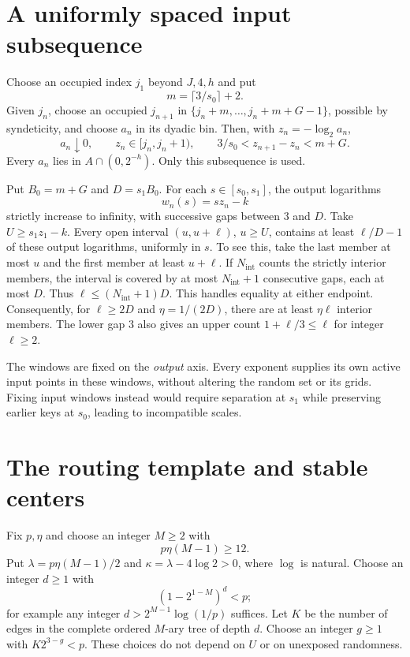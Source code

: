 \documentclass[11pt,letterpaper]{article}
\newcommand{\logtwo}{\log_2}
\begin{document}
\section{A uniformly spaced input subsequence}
Choose an occupied index $j_1$ beyond $J,4,h$ and put
\[
 m=\lceil3/s_0\rceil+2.
\]
Given $j_n$, choose an occupied $j_{n+1}$ in
$\{j_n+m,\ldots,j_n+m+G-1\}$, possible by syndeticity, and choose $a_n$ in
its dyadic bin. Then, with $z_n=-\logtwo a_n$,
\[
 a_n\downarrow0,\qquad z_n\in[j_n,j_n+1),\qquad
 3/s_0<z_{n+1}-z_n<m+G.
\]
Every $a_n$ lies in $A\cap(0,2^{-h})$. Only this subsequence is used.

Put $B_0=m+G$ and $D=s_1B_0$. For each $s\in[s_0,s_1]$, the output logarithms
\[
 w_n(s)=sz_n-k
\]
strictly increase to infinity, with successive gaps between $3$ and $D$.
Take $U\ge s_1z_1-k$. Every open interval $(u,u+\ell)$, $u\ge U$, contains
at least $\ell/D-1$ of these output logarithms, uniformly in $s$.
To see this, take the last member at most $u$ and the first member at least
$u+\ell$. If $N_\mathrm{int}$ counts the strictly interior members, the interval
is covered by at most $N_\mathrm{int}+1$ consecutive gaps, each at most $D$.
Thus $\ell\le(N_\mathrm{int}+1)D$. This handles equality at either endpoint.
Consequently, for $\ell\ge2D$ and $\eta=1/(2D)$, there are at least
$\eta\ell$ interior members. The lower gap $3$ also gives an upper count
$1+\ell/3\le\ell$ for integer $\ell\ge2$.

The windows are fixed on the \emph{output} axis. Every exponent supplies its
own active input points in these windows, without altering the random set or
its grids. Fixing input windows instead would require separation at $s_1$
while preserving earlier keys at $s_0$, leading to incompatible scales.

\section{The routing template and stable centers}
Fix $p,\eta$ and choose an integer $M\ge2$ with
\[
 p\eta(M-1)\ge12.
\]
Put $\lambda=p\eta(M-1)/2$ and $\kappa=\lambda-4\log2>0$, where $\log$ is
natural. Choose an integer $d\ge1$ with
\[
 (1-2^{1-M})^d<p;
\]
for example any integer $d>2^{M-1}\log(1/p)$ suffices. Let $K$ be the number
of edges in the complete ordered $M$-ary tree of depth $d$. Choose an integer
$g\ge1$ with $K2^{3-g}<p$. These choices do not depend on $U$ or on unexposed
randomness.
\end{document}
